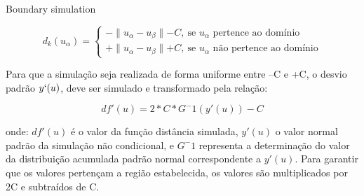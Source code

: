 \documentclass[aspectratio=169]{beamer}
\begin{document}
\begin{frame}{Boundary simulation}

	\begin{equation}
	d_k(u_\alpha)=\begin{cases}
	-\parallel u_\alpha-u_\beta\parallel - C,\:\textrm{se $u_\alpha$ pertence ao domínio}\\
	+\parallel u_\alpha-u_\beta\parallel + C,\:\textrm{se $u_\alpha$ não pertence ao domínio}\end{cases}
	\label{C_dist}
	\end{equation}
	
	Para que a simulação seja realizada de forma uniforme entre –C e +C, o desvio padrão $y`(u)$, deve ser simulado e transformado pela relação:
	
	
	\begin{equation}
	df'(u)=2*C*G^-1(y'(u))-C
	\end{equation}
	
	onde: $df'(u)$ é o valor da função distância simulada, $y'(u)$ o valor normal padrão da simulação não condicional, e $G^-1$ representa a determinação do valor da distribuição acumulada padrão normal correspondente a $y'(u)$. Para garantir que os valores pertençam a região estabelecida, os valores são multiplicados por 2C e subtraídos de C.
\end{frame}
\end{document}

